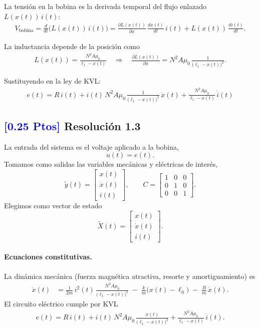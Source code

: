 \documentclass[
  11pt,
  letterpaper,
   addpoints,
   answers
  ]{exam}
\begin{document}
\begin{solution}
La tensión en la bobina es la derivada temporal del flujo enlazado \(L(x(t))\,i(t)\):
\begin{align}
V_{\mathrm{bobina}}
= \frac{d}{dt}\!\big(L(x(t))\,i(t)\big)
= \frac{\partial L(x(t))}{\partial x}\,\frac{dx(t)}{dt}\,i(t) + L(x(t))\,\frac{di(t)}{dt}.
\end{align}

La inductancia depende de la posición como
\begin{align}
L(x(t))=\frac{N^{2}A\mu_{0}}{\ell_{1}-x(t)}
\quad\Rightarrow\quad
\frac{\partial L(x(t))}{\partial x} = N^{2}A\mu_{0}\,\frac{1}{\big(\ell_{1}-x(t)\big)^{2}} .
\end{align}

Sustituyendo en la ley de KVL:
\begin{align}
\boxed{\,e(t)
= R\,i(t)
+ i(t)\,N^{2}A\mu_{0}\,\frac{1}{\big(\ell_{1}-x(t)\big)^{2}}\,\dot x(t)
+ \frac{N^{2}A\mu_{0}}{\ell_{1}-x(t)}\,\dot i(t)\,}
\end{align}
\subsection*{\textcolor{blue}{[0.25 Ptos]} Resolución 1.3}
La entrada del sistema es el voltaje aplicado a la bobina,
\[
u(t)=e(t).
\]
Tomamos como salidas las variables mecánicas y eléctricas de interés,
\[
\tilde{y}(t)=
\begin{bmatrix}x(t)\\ \dot x(t)\\ i(t)\end{bmatrix},
\qquad
C=\begin{bmatrix}1&0&0\\ 0&1&0\\ 0&0&1\end{bmatrix}.
\]
Elegimos como vector de estado
\[
\tilde{X}(t)=
\begin{bmatrix}
x(t)\\ \dot x(t)\\ i(t)
\end{bmatrix}.
\]

\paragraph{Ecuaciones constitutivas.}
La dinámica mecánica (fuerza magnética atractiva, resorte y amortiguamiento) es
\begin{align}
\ddot x(t)
&= \frac{1}{2m}\,i^2(t)\, \frac{N^{2}A\mu_{0}}{\big(\ell_{1}-x(t)\big)^{2}}
   \;-\; \frac{k}{m}\big(x(t)-\ell_{0}\big)
   \;-\; \frac{B}{m}\,\dot x(t).
\tag{1}\label{eq:mecanica}
\end{align}
El circuito eléctrico cumple por KVL
\begin{align}
e(t) = R\,i(t)
       + i(t)\,N^{2}A\mu_{0}\,\frac{\dot x(t)}{\big(\ell_{1}-x(t)\big)^{2}}
       + \frac{N^{2}A\mu_{0}}{\ell_{1}-x(t)}\,\dot i(t).
\tag{2}\label{eq:electrica}
\end{align}


\end{solution}
\end{document}

